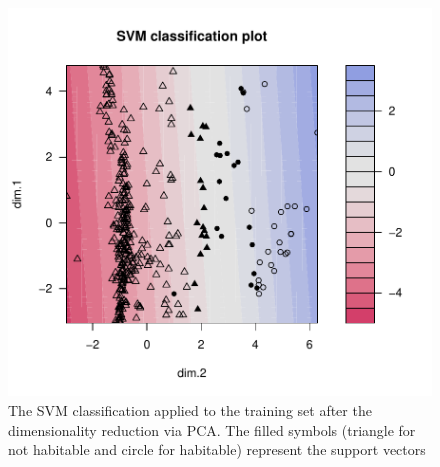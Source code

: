 \documentclass[
12pt, %
a4paper, %
oneside, %
headinclude,footinclude, %
BCOR5mm, %
]{scrartcl}
\begin{document}
\begin{figure}[h]
\begin{center}
\includegraphics[width=1\textwidth]{Pic/PCA+SVM_PLOT.pdf}
\caption{The SVM classification applied to the training set after the dimensionality reduction via PCA. The filled symbols (triangle for not habitable and circle for habitable) represent the support vectors }
\label{PCA+SVM_PLOT}
\end{center}
\end{figure}
\end{document}
